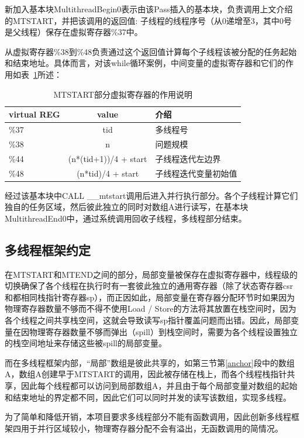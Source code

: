 新加入基本块MultithreadBegin0表示由该Pass插入的基本块，负责调用上文介绍的MTSTART，并把该调用的返回值: 子线程的线程序号（从0递增至3，其中0号是父线程）保存在虚拟寄存器\%37中。

从虚拟寄存器\%38到\%48负责通过这个返回值计算每个子线程该被分配的任务起始和结束地址。具体而言，对该while循环案例，中间变量的虚拟寄存器和它们的作用如表~\ref{tab:mt}所述：

\begin{table}[htb]
  \centering\small
  \caption{MTSTART部分虚拟寄存器的作用说明}
  \label{tab:mt}
  \begin{tabular}{lcl}
    \toprule
    virtual REG   & value  & 介绍\\
    \midrule
    \%37 & tid & 多线程号\\
    \%38 & n &  问题规模\\
    \%44 & (n*(tid+1))/4 + start & 子线程迭代左边界\\
    \%48 & (n*tid)/4  + start & 子线程迭代变量初始值\\
    \bottomrule
  \end{tabular}
\end{table}

经过该基本块中CALL \_\_mtstart调用后进入并行执行部分。各个子线程计算它们独自的任务区域，然后彼此独立的同时对数组A进行读写，在基本块MultithreadEnd0中，通过系统调用回收子线程，多线程部分结束。

\subsection{多线程框架约定}

在MTSTART和MTEND之间的部分，局部变量被保存在虚拟寄存器中，线程级的切换确保了各个线程在执行时有一套彼此独立的通用寄存器（除了状态寄存器csr和都相同栈指针寄存器sp），而正因如此，局部变量在寄存器分配环节时如果因为物理寄存器数量不够而不得不使用Load / Store的方法将其放置在栈空间时，因为各个线程之间共享栈空间，这就会导致读写sp指针覆盖问题而出错。因此，局部变量在因物理寄存器数量不够而弹出（spill）到栈空间时，需要为各个线程设置独立的栈空间地址来存储这些被spill的局部变量。

而在多线程框架内部，“局部”数组是彼此共享的，如第三节第\ref{anchor}段中的数组A，数组A创建早于MTSTART的调用，因此被存储在栈上，而各个线程栈指针共享，因此每个线程都可以访问到局部数组A，并且由于每个局部变量对数组的起始和结束地址的界定都不同，因此它们可以同时并发的读写该数组，实现多线程。

为了简单和降低开销，本项目要求多线程部分不能有函数调用，因此创新多线程框架四用于并行区域较小，物理寄存器分配不会有溢出，无函数调用的简情况。
